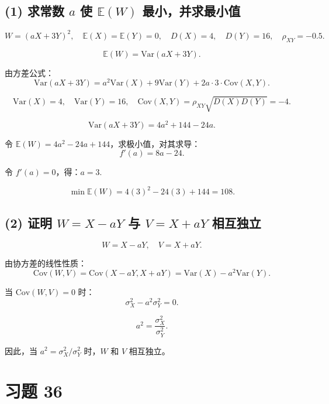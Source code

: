 \documentclass[twoside]{article}
\begin{document}
\begin{ans}{34}{34}
    \subsection*{(1) 求常数 \( a \) 使 \( \mathbb{E}(W) \) 最小，并求最小值}

    \[
    W = (aX + 3Y)^2, \quad \mathbb{E}(X) = \mathbb{E}(Y) = 0, \quad D(X) = 4, \quad D(Y) = 16, \quad \rho_{XY} = -0.5.
    \]
    
    \[
    \mathbb{E}(W) = \text{Var}(aX + 3Y).
    \]
    
    由方差公式：
    \[
    \text{Var}(aX + 3Y) = a^2 \text{Var}(X) + 9 \text{Var}(Y) + 2a \cdot 3 \cdot \text{Cov}(X, Y).
    \]
    
    \[
    \text{Var}(X) = 4, \quad \text{Var}(Y) = 16, \quad \text{Cov}(X, Y) = \rho_{XY} \sqrt{D(X)D(Y)} = -4.
    \]
    
    \[
    \text{Var}(aX + 3Y) = 4a^2 + 144 - 24a.
    \]
    
    令 \( \mathbb{E}(W) = 4a^2 - 24a + 144 \)，求极小值，对其求导：
    \[
    f'(a) = 8a - 24.
    \]
    
    令 \( f'(a) = 0 \)，得：$a = 3$.
    
    \[
    \min \mathbb{E}(W) = 4(3)^2 - 24(3) + 144 = 108.
    \]
    
    \subsection*{(2) 证明 \( W = X - aY \) 与 \( V = X + aY \) 相互独立}
    
    \[
    W = X - aY, \quad V = X + aY.
    \]
    
    由协方差的线性性质：
    \[
    \text{Cov}(W, V) = \text{Cov}(X - aY, X + aY) = \text{Var}(X) - a^2 \text{Var}(Y).
    \]
    
    当 \( \text{Cov}(W, V) = 0 \) 时：
    \[
    \sigma_X^2 - a^2 \sigma_Y^2 = 0.
    \]
    
    \[
    a^2 = \frac{\sigma_X^2}{\sigma_Y^2}.
    \]
    
    因此，当 \( a^2 = \sigma_X^2 / \sigma_Y^2 \) 时，\( W \) 和 \( V \) 相互独立。
\end{ans}

\section{习题 36}
\end{document}
